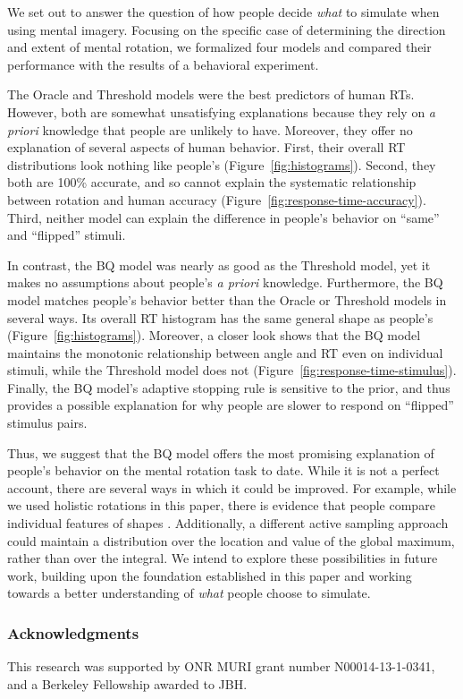 \documentclass[10pt,letterpaper]{article}
\newcommand{\Oc}[0]{Oracle}
\newcommand{\Th}[0]{Threshold}
\newcommand{\Bq}[0]{BQ}
\begin{document}
We set out to answer the question of how people decide \textit{what}
to simulate when using mental imagery. Focusing on the specific case
of determining the direction and extent of mental rotation, we
formalized four models and compared their performance with the results
of a behavioral experiment.

The \Oc{} and \Th{} models were the best predictors of human
RTs. However, both are somewhat unsatisfying explanations because they
rely on \textit{a priori} knowledge that people are unlikely to
have. Moreover, they offer no explanation of several aspects of human
behavior. First, their overall RT distributions look nothing like
people's (Figure~\ref{fig:histograms}).  Second, they both are 100\%
accurate, and so cannot explain the systematic relationship between
rotation and human accuracy
(Figure~\ref{fig:response-time-accuracy}). Third, neither model can
explain the difference in people's behavior on ``same'' and
``flipped'' stimuli.

In contrast, the \Bq{} model was nearly as good as the \Th{} model,
yet it makes no assumptions about people's \textit{a priori}
knowledge. Furthermore, the \Bq{} model matches people's behavior
better than the \Oc{} or \Th{} models in several ways. Its overall RT
histogram has the same general shape as people's
(Figure~\ref{fig:histograms}).  Moreover, a closer look shows that the
\Bq{} model maintains the monotonic relationship between angle and RT
even on individual stimuli, while the \Th{} model does not
(Figure~\ref{fig:response-time-stimulus}). Finally, the \Bq{} model's
adaptive stopping rule is sensitive to the prior, and thus provides a
possible explanation for why people are slower to respond on
``flipped'' stimulus pairs.

Thus, we suggest that the \Bq{} model offers the most promising
explanation of people's behavior on the mental rotation task to
date. While it is not a perfect account, there are several ways in
which it could be improved. For example, while we used holistic
rotations in this paper, there is evidence that people compare
individual features of shapes
\cite{Just1976,Yuille:1982tx}. Additionally, a different active
sampling approach could maintain a distribution over the location and
value of the global maximum, rather than over the integral. We intend
to explore these possibilities in future work, building upon the
foundation established in this paper and working towards a better
understanding of \textit{what} people choose to simulate.



\subsubsection{Acknowledgments} {\small This research was supported by ONR
  MURI grant number N00014-13-1-0341, and a Berkeley Fellowship
  awarded to JBH. }


\renewcommand{\bibliographytypesize}{\small}
\setlength{\bibleftmargin}{.125in}
\setlength{\bibindent}{-\bibleftmargin}
\vspace{-0.27cm}

\end{document}
